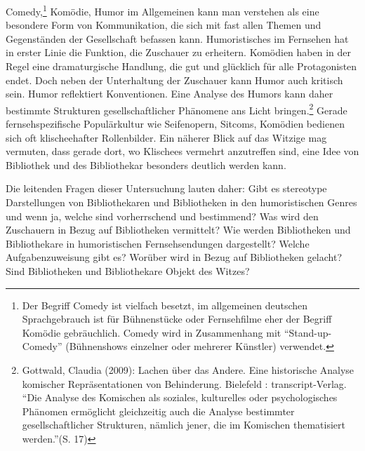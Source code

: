 Comedy,\footnote{Der Begriff Comedy ist vielfach besetzt, im allgemeinen
  deutschen Sprachgebrauch ist für Bühnenstücke oder Fernsehfilme eher
  der Begriff Komödie gebräuchlich. Comedy wird in Zusammenhang mit
  \enquote{Stand-up-Comedy} (Bühnenshows einzelner oder mehrerer
  Künstler) verwendet.} Komödie, Humor im Allgemeinen kann man verstehen
als eine besondere Form von Kommunikation, die sich mit fast allen
Themen und Gegenständen der Gesellschaft befassen kann. Humoristisches
im Fernsehen hat in erster Linie die Funktion, die Zuschauer zu
erheitern. Komödien haben in der Regel eine dramaturgische Handlung, die
gut und glücklich für alle Protagonisten endet. Doch neben der
Unterhaltung der Zuschauer kann Humor auch kritisch sein. Humor
reflektiert Konventionen. Eine Analyse des Humors kann daher bestimmte
Strukturen gesellschaftlicher Phänomene ans Licht bringen.\footnote{Gottwald,
  Claudia (2009): Lachen über das Andere. Eine historische Analyse
  komischer Repräsentationen von Behinderung. Bielefeld :
  transcript-Verlag. \enquote{Die Analyse des Komischen als soziales,
  kulturelles oder psychologisches Phänomen ermöglicht gleichzeitig auch
  die Analyse bestimmter gesellschaftlicher Strukturen, nämlich jener,
  die im Komischen thematisiert werden.}(S. 17)} Gerade
fernsehspezifische Populärkultur wie Seifenopern, Sitcoms, Komödien
bedienen sich oft klischeehafter Rollenbilder. Ein näherer Blick auf das
Witzige mag vermuten, dass gerade dort, wo Klischees vermehrt
anzutreffen sind, eine Idee von Bibliothek und des Bibliothekar
besonders deutlich werden kann.

Die leitenden Fragen dieser Untersuchung lauten daher: Gibt es
stereotype Darstellungen von Bibliothekaren und Bibliotheken in den
humoristischen Genres und wenn ja, welche sind vorherrschend und
bestimmend? Was wird den Zuschauern in Bezug auf Bibliotheken
vermittelt? Wie werden Bibliotheken und Bibliothekare in humoristischen
Fernsehsendungen dargestellt? Welche Aufgabenzuweisung gibt es? Worüber
wird in Bezug auf Bibliotheken gelacht? Sind Bibliotheken und
Bibliothekare Objekt des Witzes?

